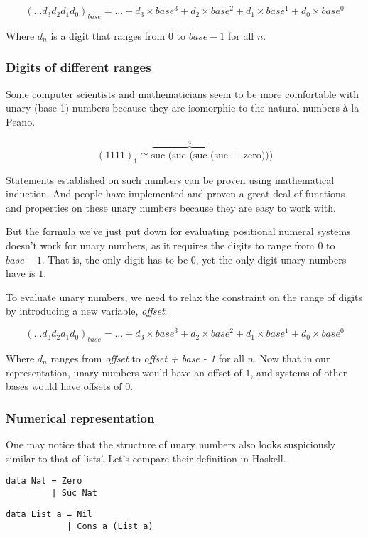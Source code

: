 \documentclass[12pt, a4paper]{article}
\begin{document}
$$
    ({...d_3d_2d_1d_0})_{base}
    =
    ... + d_3\times base^3 + d_2\times base^2 + d_1\times base^1 + d_0\times base^0
$$

Where $ d_{n} $ is a digit that ranges from $ 0 $ to $ base - 1 $ for all $ n $.


\subsubsection{Digits of different ranges}

Some computer scientists and mathematicians seem to be more comfortable with
unary (base-1) numbers because they are isomorphic to the natural numbers à la Peano.


$$
    (1111)_{1} \cong
        \overbrace{\text{suc (suc (suc (suc}}^4 + \text{ zero)))}
$$

Statements established on such numbers can be proven using mathematical
induction. And people have implemented and proven a great deal of functions and
properties on these unary numbers because they are easy to work with.

But the formula we've just put down for evaluating positional numeral systems
doesn't work for unary numbers, as it requires the digits to range from $ 0 $ to
$ base - 1 $. That is, the only digit has to be $ 0 $, yet the only digit unary
numbers have is $ 1 $.

To evaluate unary numbers, we need to relax the constraint on the range of digits
by introducing a new variable, \textit{offset}:

$$
    ({...d_3d_2d_1d_0})_{base}
    =
    ... + d_3\times base^3 + d_2\times base^2 + d_1\times base^1 + d_0\times base^0
$$

Where $ d_{n} $ ranges from \textit{offset} to \textit{offset + base - 1} for
all $ n $. Now that in our representation, unary numbers would have an offset of $ 1 $,
and systems of other bases would have offsets of $ 0 $.

\subsubsection{Numerical representation}


One may notice that the structure of unary numbers also looks suspiciously similar
to that of lists'. Let's compare their definition in Haskell.

\noindent\begin{minipage}{.45\textwidth}
\begin{lstlisting}
data Nat = Zero
         | Suc Nat
\end{lstlisting}
\end{minipage}\hfill
\begin{minipage}{.48\textwidth}
\begin{lstlisting}
data List a = Nil
            | Cons a (List a)
\end{lstlisting}
\end{minipage}
\end{document}
